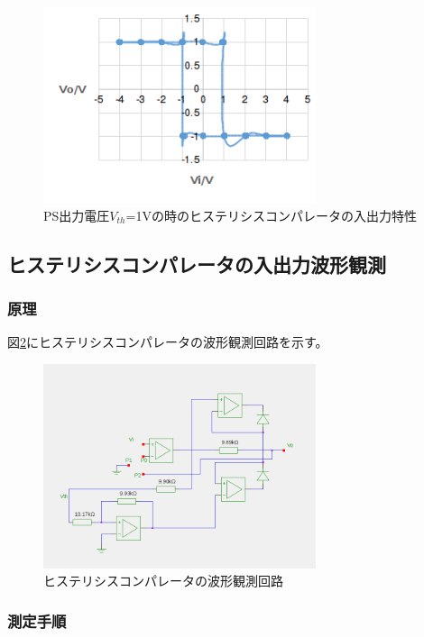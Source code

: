 \documentclass[11pt,a4j]{jsarticle}
\begin{document}
 \begin{figure}[htbp]
  \centering
  \includegraphics[width=8cm,clip]{1_2_histeri_Vth1.png}
  \caption{PS出力電圧$V_{th}$=1Vの時のヒステリシスコンパレータの入出力特性}
  \label{fig:1_2_histeri_Vth1}
 \end{figure}%
    
    
    
  \subsection{ヒステリシスコンパレータの入出力波形観測}
   \subsubsection{原理}
    
    図\ref{fig:histeri_wave}にヒステリシスコンパレータの波形観測回路を示す。
    
    \begin{figure}[htbp]
  \centering
  \includegraphics[width=8cm,clip]{histeri_wave.png}
  \caption{ヒステリシスコンパレータの波形観測回路}
  \label{fig:histeri_wave}
 \end{figure}%
    
   \subsubsection{測定手順}
    
\end{document}

